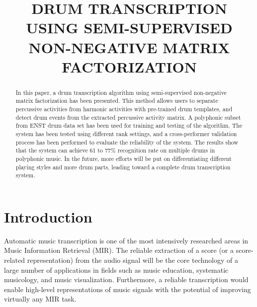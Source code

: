 \documentclass{article}
\title{DRUM TRANSCRIPTION USING SEMI-SUPERVISED NON-NEGATIVE MATRIX FACTORIZATION}
\begin{document}
%
\maketitle
%
\begin{abstract}
In this paper, a drum transcription algorithm using semi-supervised non-negative matrix factorization has been presented. This method allows users to separate percussive activities from harmonic activities with pre-trained drum templates, and detect drum events from the extracted percussive activity matrix. A polyphonic subset from ENST drum data set has been used for training and testing of the algorithm. The system has been tested using different rank settings, and a cross-performer validation process has been performed to evaluate the reliability of the system.  The results show that the system can achieve 61 to 77\% recognition rate on multiple drums in polyphonic music. In the future, more efforts will be put on differentiating different playing styles and more drum parts, leading toward a complete drum transcription system.

\end{abstract}
%

\section{Introduction}\label{sec:introduction}
Automatic music transcription is one of the most intensively researched areas in Music Information Retrieval (MIR). The reliable extraction of a score (or a score-related representation) from the audio signal will be the core technology of a large number of applications in fields such as music education, systematic musicology, and music visualization. Furthermore, a reliable transcription would enable high-level representations of music signals with the potential of improving virtually any MIR task.

\end{document}
